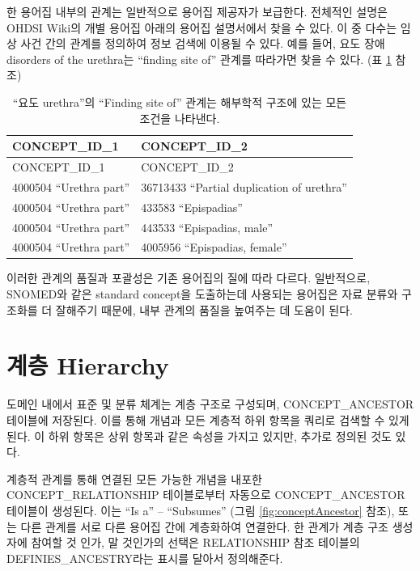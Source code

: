 \documentclass[10.5pt]{book}
\theoremstyle{definition}
\theoremstyle{definition}
\theoremstyle{definition}
\theoremstyle{remark}
\begin{document}
한 용어집 내부의 관계는 일반적으로 용어집 제공자가 보급한다. 전체적인
설명은 OHDSI Wiki의 개별 용어집 아래의 용어집 설명서에서 찾을 수 있다.
이 중 다수는 임상 사건 간의 관계를 정의하여 정보 검색에 이용될 수 있다.
예를 들어, 요도 장애 disorders of the urethra는 ``finding site of''
관계를 따라가면 찾을 수 있다. (표 \ref{tab:findingSite} 참조)

\begin{longtable}[]{@{}ll@{}}
\caption{\label{tab:findingSite} ``요도 urethra''의 ``Finding site of''
관계는 해부학적 구조에 있는 모든 조건을 나타낸다.}\tabularnewline
\toprule
CONCEPT\_ID\_1 & CONCEPT\_ID\_2\tabularnewline
\midrule
\endfirsthead
\toprule
CONCEPT\_ID\_1 & CONCEPT\_ID\_2\tabularnewline
\midrule
\endhead
4000504 ``Urethra part'' & 36713433 ``Partial duplication of
urethra''\tabularnewline
4000504 ``Urethra part'' & 433583 ``Epispadias''\tabularnewline
4000504 ``Urethra part'' & 443533 ``Epispadias, male''\tabularnewline
4000504 ``Urethra part'' & 4005956 ``Epispadias, female''\tabularnewline
\bottomrule
\end{longtable}

이러한 관계의 품질과 포괄성은 기존 용어집의 질에 따라 다르다.
일반적으로, SNOMED와 같은 standard concept을 도출하는데 사용되는
용어집은 자료 분류와 구조화를 더 잘해주기 때문에, 내부 관계의 품질을
높여주는 데 도움이 된다.

\section{계층 Hierarchy}\label{conceptAncestor}

도메인 내에서 표준 및 분류 체계는 계층 구조로 구성되며,
CONCEPT\_ANCESTOR 테이블에 저장된다. 이를 통해 개념과 모든 계층적 하위
항목을 쿼리로 검색할 수 있게 된다. 이 하위 항목은 상위 항목과 같은
속성을 가지고 있지만, 추가로 정의된 것도 있다.

계층적 관계를 통해 연결된 모든 가능한 개념을 내포한
CONCEPT\_RELATIONSHIP 테이블로부터 자동으로 CONCEPT\_ANCESTOR 테이블이
생성된다. 이는 ``Is a'' -- ``Subsumes'' (그림 \ref{fig:conceptAncestor}
참조), 또는 다른 관계를 서로 다른 용어집 간에 계층화하여 연결한다. 한
관계가 계층 구조 생성자에 참여할 것 인가, 말 것인가의 선택은
RELATIONSHIP 참조 테이블의 DEFINIES\_ANCESTRY라는 표시를 달아서
정의해준다.
\end{document}
